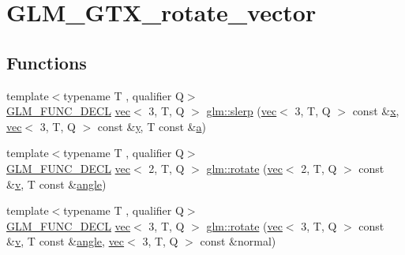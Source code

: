 \hypertarget{group__gtx__rotate__vector}{}\section{G\+L\+M\+\_\+\+G\+T\+X\+\_\+rotate\+\_\+vector}
\label{group__gtx__rotate__vector}
\subsection*{Functions}
\begin{DoxyCompactItemize}
\item 
{\footnotesize template$<$typename T , qualifier Q$>$ }\\\hyperlink{setup_8hpp_ab2d052de21a70539923e9bcbf6e83a51}{G\+L\+M\+\_\+\+F\+U\+N\+C\+\_\+\+D\+E\+CL} \hyperlink{structglm_1_1vec}{vec}$<$ 3, T, Q $>$ \hyperlink{group__gtx__rotate__vector_ga8b11b18ce824174ea1a5a69ea14e2cee}{glm\+::slerp} (\hyperlink{structglm_1_1vec}{vec}$<$ 3, T, Q $>$ const \&\hyperlink{_s_d_l__opengl_8h_ad0e63d0edcdbd3d79554076bf309fd47}{x}, \hyperlink{structglm_1_1vec}{vec}$<$ 3, T, Q $>$ const \&\hyperlink{_s_d_l__opengl_8h_a1675d9d7bb68e1657ff028643b4037e3}{y}, T const \&\hyperlink{_s_d_l__opengl__glext_8h_a3309789fc188587d666cda5ece79cf82}{a})
\item 
{\footnotesize template$<$typename T , qualifier Q$>$ }\\\hyperlink{setup_8hpp_ab2d052de21a70539923e9bcbf6e83a51}{G\+L\+M\+\_\+\+F\+U\+N\+C\+\_\+\+D\+E\+CL} \hyperlink{structglm_1_1vec}{vec}$<$ 2, T, Q $>$ \hyperlink{group__gtx__rotate__vector_gab64a67b52ff4f86c3ba16595a5a25af6}{glm\+::rotate} (\hyperlink{structglm_1_1vec}{vec}$<$ 2, T, Q $>$ const \&\hyperlink{_s_d_l__opengl_8h_a10a82eabcb59d2fcd74acee063775f90}{v}, T const \&\hyperlink{_s_d_l__opengl__glext_8h_a9e06c1f76a20fed54ca742cd25cb02c4}{angle})
\item 
{\footnotesize template$<$typename T , qualifier Q$>$ }\\\hyperlink{setup_8hpp_ab2d052de21a70539923e9bcbf6e83a51}{G\+L\+M\+\_\+\+F\+U\+N\+C\+\_\+\+D\+E\+CL} \hyperlink{structglm_1_1vec}{vec}$<$ 3, T, Q $>$ \hyperlink{group__gtx__rotate__vector_ga1ba501ef83d1a009a17ac774cc560f21}{glm\+::rotate} (\hyperlink{structglm_1_1vec}{vec}$<$ 3, T, Q $>$ const \&\hyperlink{_s_d_l__opengl_8h_a10a82eabcb59d2fcd74acee063775f90}{v}, T const \&\hyperlink{_s_d_l__opengl__glext_8h_a9e06c1f76a20fed54ca742cd25cb02c4}{angle}, \hyperlink{structglm_1_1vec}{vec}$<$ 3, T, Q $>$ const \&normal)

\end{DoxyCompactItemize}
